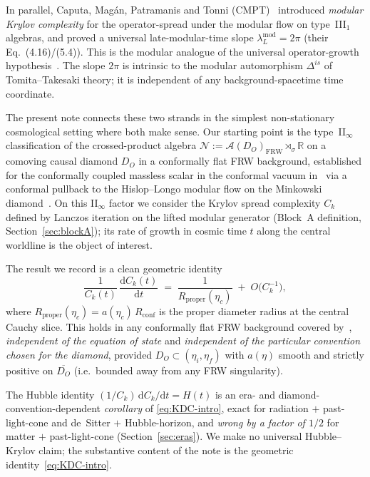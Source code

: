 \documentclass[11pt]{article}
\theoremstyle{definition}
\newcommand{\R}{\mathbb{R}}
\renewcommand{\AA}{\mathcal{A}}
\newcommand{\NN}{\mathcal{N}}
\newcommand{\FRW}{\mathrm{FRW}}
\newcommand{\Rprop}{R_{\mathrm{proper}}}
\newcommand{\Rconf}{R_{\mathrm{conf}}}
\begin{document}
In parallel, Caputa, Mag\'an, Patramanis and Tonni
(CMPT)~\cite{CMPT24} introduced \emph{modular Krylov complexity} for
the operator-spread under the modular flow on type~III$_1$ algebras,
and proved a universal late-modular-time slope $\lambda_L^{\mathrm{mod}}
= 2\pi$ (their Eq.~(4.16)/(5.4)). This is the modular analogue of the
universal operator-growth hypothesis~\cite{ParkerEtAl2019}. The slope
$2\pi$ is intrinsic to the modular automorphism $\Delta^{is}$ of
Tomita--Takesaki theory; it is independent of any background-spacetime
time coordinate.

The present note connects these two strands in the simplest
non-stationary cosmological setting where both make sense. Our
starting point is the type~II$_\infty$ classification of the
crossed-product algebra
\(\NN := \AA(D_O)_\FRW \rtimes_\sigma \R\)
on a comoving causal diamond $D_O$ in a conformally flat FRW
background, established for the conformally coupled massless scalar
in the conformal vacuum in~\cite[Thm.~3.5]{Remondiere2026} via a
conformal pullback to the Hislop--Longo modular flow on the
Minkowski diamond~\cite{HislopLongo1982}. On this II$_\infty$
factor we consider the Krylov spread complexity $C_k$ defined by
Lanczos iteration on the lifted modular generator (Block~A
definition, Section~\ref{sec:blockA}); its rate of growth in cosmic
time $t$ along the central worldline is the object of interest.

The result we record is a clean geometric identity
\begin{equation}\label{eq:KDC-intro}
\frac{1}{C_k(t)}\,\frac{\mathrm{d}C_k(t)}{\mathrm{d}t}
\;=\; \frac{1}{\Rprop(\eta_c)}
\;+\; O\!\big(C_k^{-1}\big),
\end{equation}
where $\Rprop(\eta_c) = a(\eta_c)\,\Rconf$ is the proper diameter
radius at the central Cauchy slice. This holds in any conformally
flat FRW background covered by~\cite[Thms.~3.5--3.6, Cor.~3.7]{Remondiere2026},
\emph{independent of the equation of state} and \emph{independent of
the particular convention chosen for the diamond}, provided
$D_O\subset (\eta_i,\eta_f)$ with $a(\eta)$ smooth and strictly
positive on $\overline{D_O}$ (i.e.\ bounded away from any FRW
singularity).

The Hubble identity $(1/C_k)\,\mathrm{d}C_k/\mathrm{d}t = H(t)$ is
an era- and diamond-convention-dependent \emph{corollary} of
\eqref{eq:KDC-intro}, exact for radiation $+$ past-light-cone and
de~Sitter $+$ Hubble-horizon, and \emph{wrong by a factor of $1/2$}
for matter $+$ past-light-cone (Section~\ref{sec:eras}). We make no
universal Hubble--Krylov claim; the substantive content of the note
is the geometric identity~\eqref{eq:KDC-intro}.
\end{document}
